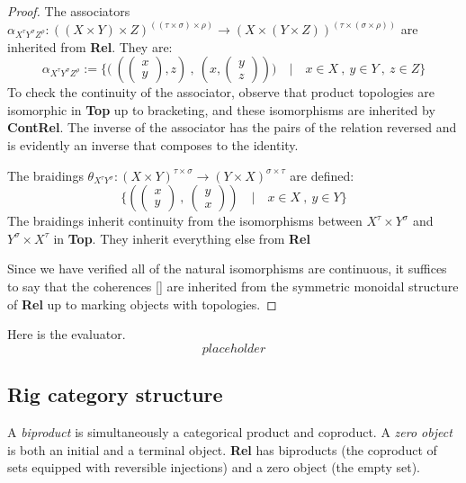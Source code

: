 \begin{marginfigure}
\begin{proposition}
\begin{proof}
The associators $\alpha_{X^{\tau}Y^{\sigma}Z^{\rho}} : ((X \times Y) \times Z)^{((\tau \times \sigma) \times \rho)} \rightarrow (X \times (Y \times Z))^{(\tau \times (\sigma \times \rho))}$ are inherited from \textbf{Rel}. They are:
\[\alpha_{X^{\tau}Y^{\sigma}Z^{\rho}} := \{\big( \ (\begin{pmatrix} x \\ y \end{pmatrix} , z) \ , \ (x, \begin{pmatrix} y \\ z \end{pmatrix}) \big) \quad | \quad x \in X \ , \ y \in Y \ ,\ z \in Z \}\]
To check the continuity of the associator, observe that product topologies are isomorphic in \textbf{Top} up to bracketing, and these isomorphisms are inherited by \textbf{ContRel}. The inverse of the associator has the pairs of the relation reversed and is evidently an inverse that composes to the identity.

The braidings $\theta_{X^{\tau}Y^{\sigma}} : (X \times Y)^{\tau \times \sigma} \rightarrow (Y \times X)^{\sigma \times \tau}$ are defined:
\[\{(\begin{pmatrix} x \\ y \end{pmatrix} \ , \ \begin{pmatrix} y \\ x \end{pmatrix}) \quad | \quad x \in X \ , \ y \in Y  \}\]
The braidings inherit continuity from the isomorphisms between $X^\tau \times Y^\sigma$ and $Y^\sigma \times X^\tau$ in \textbf{Top}. They inherit everything else from \textbf{Rel}

Since we have verified all of the natural isomorphisms are continuous, it suffices to say that the coherences [] are inherited from the symmetric monoidal structure of \textbf{Rel} up to marking objects with topologies.
\end{proof}

Here is the evaluator.
\[placeholder\]
\end{proposition}

\subsection{Rig category structure}

\begin{defn}
A \emph{biproduct} is simultaneously a categorical product and coproduct. A \emph{zero object} is both an initial and a terminal object. \textbf{Rel} has biproducts (the coproduct of sets equipped with reversible injections) and a zero object (the empty set).
\end{defn}


\end{marginfigure}
